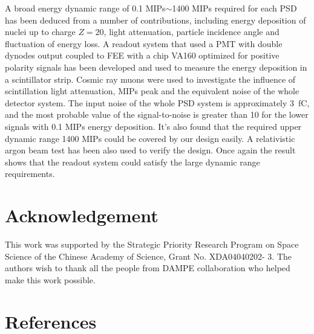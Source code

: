 \documentclass[5p, times]{elsarticle}
\begin{document}
A broad energy dynamic range of 0.1 MIPs$\sim$1400 MIPs required for each PSD has been deduced from a number of contributions, including energy deposition of nuclei up to charge $Z=20$, light attenuation, particle incidence angle and fluctuation of energy loss. 
A readout system that used a PMT with double dynodes output coupled to FEE with a chip VA160 optimized for positive polarity signals has been developed and used to measure the energy deposition in a scintillator strip. 
Cosmic ray muons were used to investigate the influence of scintillation light attenuation, MIPs peak and the equivalent noise of the whole detector system. 
The input noise of the whole PSD system is approximately \SI{3}{\femto\coulomb}, and the most probable value of the signal-to-noise is greater than 10 for the lower signals with 0.1 MIPs energy deposition. 
It’s also found that the required upper dynamic range 1400 MIPs could be covered by our design easily. 
A relativistic argon beam test has been also used to verify the design. 
Once again the result shows that the readout system could satisfy the large dynamic range requirements.

\section*{Acknowledgement}
\label{sec:acknowledgement}

This work was supported by the Strategic Priority Research Program on Space Science of the Chinese Academy of Science,
Grant No. XDA04040202- 3. The authors wish to thank all the people from DAMPE collaboration who helped make this work
possible.

\section*{References}
\label{sec:reference}



\end{document}
